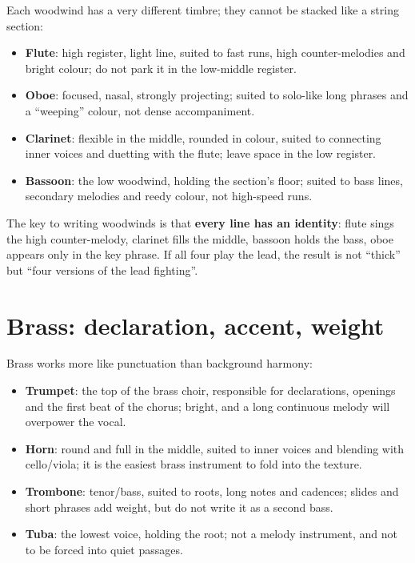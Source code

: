Each woodwind has a very different timbre; they cannot be stacked like a string section:

\begin{itemize}
\item \textbf{Flute}: high register, light line, suited to fast runs, high counter-melodies and bright colour; do not park it in the low-middle register.
\item \textbf{Oboe}: focused, nasal, strongly projecting; suited to solo-like long phrases and a ``weeping'' colour, not dense accompaniment.
\item \textbf{Clarinet}: flexible in the middle, rounded in colour, suited to connecting inner voices and duetting with the flute; leave space in the low register.
\item \textbf{Bassoon}: the low woodwind, holding the section's floor; suited to bass lines, secondary melodies and reedy colour, not high-speed runs.
\end{itemize}

The key to writing woodwinds is that \textbf{every line has an identity}: flute sings the high counter-melody, clarinet fills the middle, bassoon holds the bass, oboe appears only in the key phrase. If all four play the lead, the result is not ``thick'' but ``four versions of the lead fighting''.

\section{Brass: declaration, accent, weight}
\label{sec:brass}

Brass works more like punctuation than background harmony:

\begin{itemize}
\item \textbf{Trumpet}: the top of the brass choir, responsible for declarations, openings and the first beat of the chorus; bright, and a long continuous melody will overpower the vocal.
\item \textbf{Horn}: round and full in the middle, suited to inner voices and blending with cello/viola; it is the easiest brass instrument to fold into the texture.
\item \textbf{Trombone}: tenor/bass, suited to roots, long notes and cadences; slides and short phrases add weight, but do not write it as a second bass.
\item \textbf{Tuba}: the lowest voice, holding the root; not a melody instrument, and not to be forced into quiet passages.
\end{itemize}

